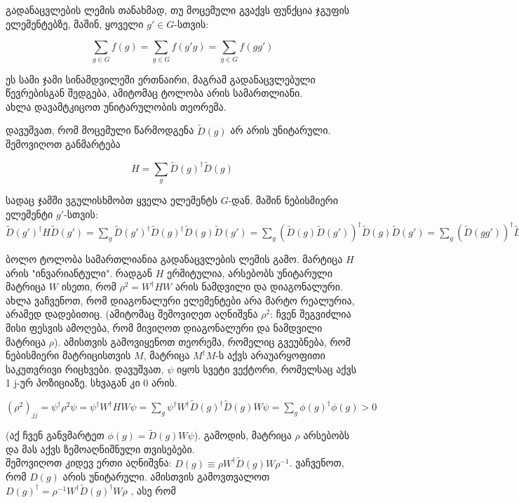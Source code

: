 \documentclass[12pt]{article}
\begin{document}
\begin{sloppypar}
გადანაცვლების ლემის თანახმად, თუ მოცემული გვაქვს ფუნქცია ჯგუფის ელემენტებზე, მაშინ, ყოველი $g' \in G$-სთვის:

\begin{equation} \label{Rearrangement lemma}
		\sum_{g \in G}f(g) = \sum_{g \in G}f(g'g) = \sum_{g \in G}f(gg')
\end{equation}

ეს სამი ჯამი სინამდვილეში ერთნაირი, მაგრამ გადანაცვლებული წევრებისგან შედგება, ამიტომაც ტოლობა არის სამართლიანი.\\

ახლა დავამტკიცოთ უნიტარულობის თეორემა. 

დავუშვათ, რომ მოცემული წარმოდგენა $\widetilde D(g)$ არ არის უნიტარული. შემოვიღოთ განმარტება 

$$H = \sum_{g} \widetilde D(g)^{\dagger} \widetilde D(g) $$

\sloppy სადაც ჯამში ვგულისხმობთ ყველა ელემენტს $G$-დან. მაშინ ნებისმიერი ელემენტი $g'$-სთვის: 
$
 \widetilde D(g')^{\dagger} H \widetilde D(g') = 
 \sum_{g} \widetilde D(g')^{\dagger} \widetilde D(g)^{\dagger} \widetilde D(g) \widetilde D(g') = 
 \sum_{g} (\widetilde D(g) \widetilde D(g') )^{\dagger} \widetilde D(
 g) \widetilde D(g') =
 \sum_{g} (\widetilde D(gg') )^{\dagger} \widetilde D(gg') = H
$

ბოლო ტოლობა სამართლიანია გადანაცვლების ლემის გამო. მარტიცა $H$ არის "ინვარიანტული".
რადგან $H$ ერმიტულია, არსებობს უნიტარული მატრიცა $W$ ისეთი, რომ $\rho^2=W^{\dagger}HW$ არის ნამდვილი და დიაგონალური. ახლა ვაჩვენოთ, რომ დიაგონალური ელემენტები არა მარტო რეალურია, არამედ დადებითიც. (ამიტომაც შემოვიღეთ აღნიშვნა $\rho^2$: ჩვენ შეგვიძლია მისი ფესვის ამოღება, რომ მივიღოთ დიაგონალური და ნამდვილი მატრიცა $\rho$). ამისთვის გამოვიყენოთ თეორემა, რომელიც გვეუბნება, რომ ნებისმიერი მატრიცისთვის $M$, მატრიცა $M^{\dagger}M$-ს აქვს არაუარყოფითი საკუთვრივი რიცხვები. დავუშვათ, $\psi$ იყოს სვეტი ვექტორი, რომელსაც აქვს 1 j-ურ პოზიციაზე, სხვაგან კი 0 არის.

$
 (\rho^2)_{jj} = 
 \psi^{\dagger} \rho^2 \psi =
 \psi^{\dagger} W^{\dagger}HW \psi = 
 \sum_{g} \psi^{\dagger} W^{\dagger}  \widetilde D(g)^{\dagger} \widetilde D(g) W \psi = 
 \sum_{g} \phi(g)^{\dagger} \phi(g) > 0
$


(აქ ჩვენ განვმარტეთ $\phi(g) = \widetilde D(g) W \psi$). გამოდის, მატრიცა $\rho$ არსებობს და მას აქვს ზემოაღნიშნული თვისებები.\\

შემოვიღოთ კიდევ ერთი აღნიშვნა: $D(g) \equiv \rho W^{\dagger} \widetilde D(g) W \rho^{-1}$. ვაჩვენოთ, რომ $D(g)$ არის უნიტარული. ამისთვის გამოვთვალოთ 
$D(g)^{\dagger}= \rho^{-1} W^{\dagger} \widetilde D(g)^{\dagger} W \rho$
, ასე რომ


\end{sloppypar}
\end{document}
